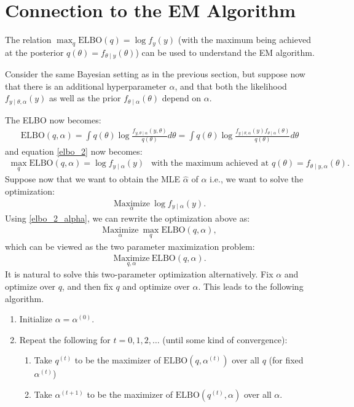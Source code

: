 \documentclass{scrartcl}
\begin{document}
\section{Connection to the EM Algorithm}

The relation $\max_q \text{ELBO}(q) = \log f_{y}(y)$ (with the maximum
being achieved at the posterior $q(\theta) = f_{\theta \mid
  y}(\theta)$) can be used to understand the EM algorithm.

Consider the same Bayesian setting as in the previous section, but
suppose now that there is an additional hyperparameter $\alpha$, and
that both the likelihood $f_{y \mid \theta, \alpha}(y)$ as well as the
prior $f_{\theta \mid \alpha}(\theta)$ depend on $\alpha$.

The ELBO now becomes:
\begin{align*}
  \text{ELBO}(q, \alpha) = \int q(\theta) \log \frac{f_{y, \theta \mid
  \alpha}(y, \theta)}{q(\theta)} d\theta = \int q(\theta) \log
  \frac{f_{y \mid \theta, \alpha}(y) f_{\theta \mid
  \alpha}(\theta)}{q(\theta)} d\theta 
\end{align*}
and equation \eqref{elbo_2} now becomes:
\begin{align}\label{elbo_2_alpha}
  \max_{q} \text{ELBO}(q, \alpha) = \log f_{y\mid \alpha}(y) ~~ \text{  with the maximum
achieved at } q(\theta) = f_{\theta \mid y, \alpha}(\theta).  
\end{align}
Suppose now that we want to obtain the MLE $\hat{\alpha}$ of $\alpha$
i.e., we want to solve the optimization: 
\begin{align*}
\underset{\alpha}{\text{Maximize}}~ \log f_{y \mid \alpha}(y). 
\end{align*}
Using \eqref{elbo_2_alpha}, we can rewrite the optimization above as:
\begin{align*}
  \underset{\alpha}{\text{Maximize}}~ \max_{q} \text{ELBO}(q, \alpha), 
\end{align*}
which can be viewed as the two parameter maximization problem:
\begin{align*}
  \underset{q, \alpha}{\text{Maximize}} ~ \text{ELBO}(q, \alpha). 
\end{align*}
It is natural to solve this two-parameter optimization
alternatively. Fix $\alpha$ and optimize over $q$, and then fix $q$
and optimize over $\alpha$. This leads to the following algorithm.
\begin{enumerate}
\item Initialize $\alpha = \alpha^{(0)}$.
\item Repeat the following for $t = 0, 1, 2, \dots$ (until some  kind
  of convergence): 
  \begin{enumerate}
  \item Take $q^{(t)}$ to be the maximizer of $\text{ELBO}(q, \alpha^{(t)})$
    over all $q$ (for fixed $\alpha^{(t)}$)
  \item Take $\alpha^{(t+1)}$ to be the maximizer of $\text{ELBO}(q^{(t)},
    \alpha)$ over all $\alpha$. 
  \end{enumerate}
\end{enumerate}
\end{document}

